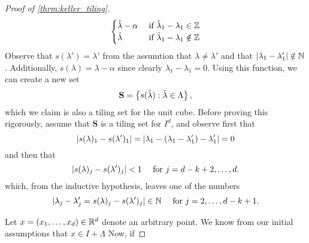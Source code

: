 \documentclass[../thesis.tex]{subfiles}
\begin{document}
\begin{proof}[Proof of \cref{thrm:keller_tiling}]
\begin{equation*}
\begin{cases}
            \tilde{\lambda} - \alpha & \text{ if } \tilde{\lambda}_1-\lambda_1 \in \mathbb{Z}\\
            \tilde{\lambda} & \text{ if } \tilde{\lambda}_1-\lambda_1 \notin \mathbb{Z}\\
        \end{cases}
    \end{equation*}
    Observe that $s(\lambda')=\lambda'$ from the assumtion that $\lambda \neq \lambda'$ and that $|\lambda_{1}-\lambda_{1}'| \notin \mathbb{N}$. Additionally, $s(\lambda)=\lambda-\alpha$ since clearly $\lambda_{1}-\lambda_{1} = 0$. Using this function, we can create a new set 
    \begin{equation*}
        \mathbf{S} = \left\{s(\tilde{\lambda}) :\tilde{\lambda} \in  \Lambda \right\},
    \end{equation*}
    which we claim is also a tiling set for the unit cube. Before proving this rigorously, assume that $\mathbf{S}$ is a tiling set for $I^d$, and observe first that 
    \begin{equation*}
        \left| s(\lambda)_1 - s(\lambda')_1\right| = \left|\lambda_1 - \left(\lambda_1-\lambda_1'\right) - \lambda_1'\right| = 0
    \end{equation*}
    and then that
    \begin{equation*}
        \left| s(\lambda)_j - s(\lambda')_j\right| < 1 \quad \text{ for } j= d-k+2,\dots,d.
    \end{equation*}
    which, from the inductive hypothesis, leaves one of the numbers 
    \begin{equation*}
        |\lambda_j - \lambda_j' = s(\lambda)_j - s(\lambda')_j| \in \mathbb{N} \quad \text{ for } j = 2,\dots, d-k+1.
    \end{equation*}


    Let $x=(x_1,\dots,x_d)\in \mathbb{R}^d$ denote an arbitrary point. We know from our initial assumptions that $x\in I+\Lambda$
    Now, if 




\end{proof}
\end{document}
